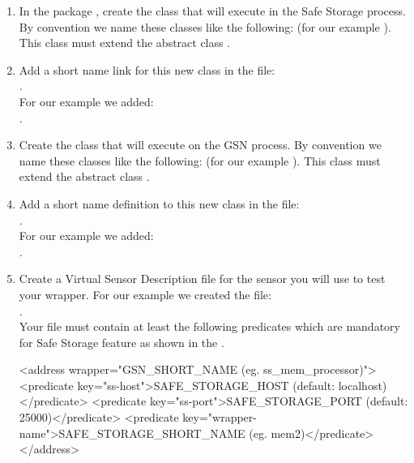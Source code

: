 \begin{enumerate}
	\item In the package ,
        create the class that will execute in the Safe Storage process. By convention we name these classes like the following:
         (for our example ). This class must extend the abstract class
        .

	\item Add a short name link for this new class in the file:\\ .\\For our example we added: \\
        .

	\item Create the class that will execute on the GSN process. By convention we name these classes like the following:
	 (for our example ). This class must extend the abstract class
	.

	\item Add a short name definition to this new class in the file:\\ .\\ For our example we added:\\
	.

	\item Create a Virtual Sensor Description file for the sensor you will use to test your wrapper. For our example we created the file:\\
	. \\
	Your \vsd file must contain at least the following predicates which are mandatory for Safe Storage feature as shown in the .
	\begin{xmlcode}
	<address wrapper="GSN_SHORT_NAME (eg. ss_mem_processor)">
		<predicate key="ss-host">SAFE_STORAGE_HOST (default: localhost)</predicate>
		<predicate key="ss-port">SAFE_STORAGE_PORT (default: 25000)</predicate>
		<predicate key="wrapper-name">SAFE_STORAGE_SHORT_NAME (eg. mem2)</predicate>
	</address>
	\end{xmlcode}


\end{enumerate}
